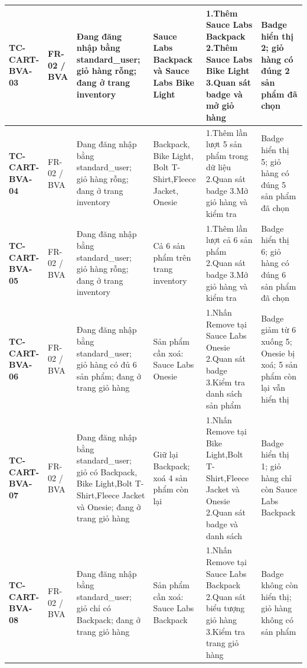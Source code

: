 {\begin{longtable}{|L{3.5cm}|L{1.9cm}|L{4.6cm}|L{3.7cm}|L{5.1cm}|L{5.1cm}|}
\hline
\textbf{\mbox{TC-CART-BVA-03}} & FR-02 / BVA & Đang đăng nhập bằng standard\_\allowbreak{}user; giỏ hàng rỗng; đang ở trang inventory & Sauce Labs Backpack và Sauce Labs Bike Light & 1.Thêm Sauce Labs Backpack \newline 2.Thêm Sauce Labs Bike Light \newline 3.Quan sát badge và mở giỏ hàng & Badge hiển thị 2; giỏ hàng có đúng 2 sản phẩm đã chọn \\
\hline
\textbf{\mbox{TC-CART-BVA-04}} & FR-02 / BVA & Đang đăng nhập bằng standard\_\allowbreak{}user; giỏ hàng rỗng; đang ở trang inventory & Backpack, Bike Light, Bolt T-Shirt,Fleece Jacket, Onesie & 1.Thêm lần lượt 5 sản phẩm trong dữ liệu \newline 2.Quan sát badge \newline 3.Mở giỏ hàng và kiểm tra & Badge hiển thị 5; giỏ hàng có đúng 5 sản phẩm đã chọn \\
\hline
\textbf{\mbox{TC-CART-BVA-05}} & FR-02 / BVA & Đang đăng nhập bằng standard\_\allowbreak{}user; giỏ hàng rỗng; đang ở trang inventory & Cả 6 sản phẩm trên trang inventory & 1.Thêm lần lượt cả 6 sản phẩm \newline 2.Quan sát badge \newline 3.Mở giỏ hàng và kiểm tra & Badge hiển thị 6; giỏ hàng có đúng 6 sản phẩm đã chọn \\
\hline
\textbf{\mbox{TC-CART-BVA-06}} & FR-02 / BVA & Đang đăng nhập bằng standard\_\allowbreak{}user; giỏ hàng có đủ 6 sản phẩm; đang ở trang giỏ hàng & Sản phẩm cần xoá: Sauce Labs Onesie & 1.Nhấn Remove tại Sauce Labs Onesie \newline 2.Quan sát badge \newline 3.Kiểm tra danh sách sản phẩm & Badge giảm từ 6 xuống 5; Onesie bị xoá; 5 sản phẩm còn lại vẫn hiển thị \\
\hline
\textbf{\mbox{TC-CART-BVA-07}} & FR-02 / BVA & Đang đăng nhập bằng standard\_\allowbreak{}user; giỏ có Backpack, Bike Light,Bolt T-Shirt,Fleece Jacket và Onesie; đang ở trang giỏ hàng & Giữ lại Backpack; xoá 4 sản phẩm còn lại & 1.Nhấn Remove tại Bike Light,Bolt T-Shirt,Fleece Jacket và Onesie \newline 2.Quan sát badge và danh sách & Badge hiển thị 1; giỏ hàng chỉ còn Sauce Labs Backpack \\
\hline
\textbf{\mbox{TC-CART-BVA-08}} & FR-02 / BVA & Đang đăng nhập bằng standard\_\allowbreak{}user; giỏ chỉ có Backpack; đang ở trang giỏ hàng & Sản phẩm cần xoá: Sauce Labs Backpack & 1.Nhấn Remove tại Sauce Labs Backpack \newline 2.Quan sát biểu tượng giỏ hàng \newline 3.Kiểm tra trang giỏ hàng & Badge không còn hiển thị; giỏ hàng không có sản phẩm \\

\end{longtable}}
